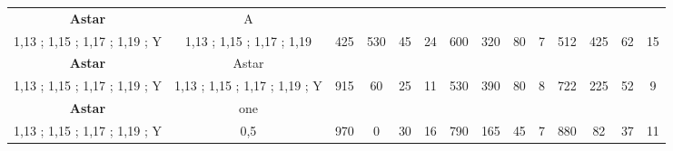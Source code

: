 \begin{table}[H]
{\begin{tabular}{|c|c|c|c|c|c|c|c|c|c|c|c|c|c|}
\cellcolor{blue!15}\textbf{Astar} & A& {\color[HTML]{00009B} } & {\color[HTML]{9A0000} } & {\color[HTML]{009901} } &  & {\color[HTML]{00009B} } & {\color[HTML]{9A0000} } & {\color[HTML]{009901} } &  & {\color[HTML]{00009B} } & {\color[HTML]{9A0000} } & {\color[HTML]{009901} } &  \\ 
\cellcolor{ blue!15}1,13 ; 1,15 ; 1,17 ; 1,19 ; Y & 1,13 ; 1,15 ; 1,17 ; 1,19 & \multirow{-2}{*}{{\color[HTML]{00009B} 425}} & \multirow{-2}{*}{{\color[HTML]{9A0000} 530}} & \multirow{-2}{*}{{\color[HTML]{009901} 45}} & \multirow{-2}{*}{24} & \multirow{-2}{*}{{\color[HTML]{00009B} 600}} & \multirow{-2}{*}{{\color[HTML]{9A0000} 320}} & \multirow{-2}{*}{{\color[HTML]{009901} 80}} & \multirow{-2}{*}{7} & \multirow{-2}{*}{{\color[HTML]{00009B} 512}} & \multirow{-2}{*}{{\color[HTML]{9A0000} 425}} & \multirow{-2}{*}{{\color[HTML]{009901} 62}} & \multirow{-2}{*}{15} \\ \hline

\cellcolor{blue!15}\textbf{Astar} & Astar& {\color[HTML]{00009B} } & {\color[HTML]{9A0000} } & {\color[HTML]{009901} } &  & {\color[HTML]{00009B} } & {\color[HTML]{9A0000} } & {\color[HTML]{009901} } &  & {\color[HTML]{00009B} } & {\color[HTML]{9A0000} } & {\color[HTML]{009901} } &  \\ 
\cellcolor{ blue!15}1,13 ; 1,15 ; 1,17 ; 1,19 ; Y & 1,13 ; 1,15 ; 1,17 ; 1,19 ; Y & \multirow{-2}{*}{{\color[HTML]{00009B} 915}} & \multirow{-2}{*}{{\color[HTML]{9A0000} 60}} & \multirow{-2}{*}{{\color[HTML]{009901} 25}} & \multirow{-2}{*}{11} & \multirow{-2}{*}{{\color[HTML]{00009B} 530}} & \multirow{-2}{*}{{\color[HTML]{9A0000} 390}} & \multirow{-2}{*}{{\color[HTML]{009901} 80}} & \multirow{-2}{*}{8} & \multirow{-2}{*}{{\color[HTML]{00009B} 722}} & \multirow{-2}{*}{{\color[HTML]{9A0000} 225}} & \multirow{-2}{*}{{\color[HTML]{009901} 52}} & \multirow{-2}{*}{9} \\ \hline

\cellcolor{blue!15}\textbf{Astar} & one& {\color[HTML]{00009B} } & {\color[HTML]{9A0000} } & {\color[HTML]{009901} } &  & {\color[HTML]{00009B} } & {\color[HTML]{9A0000} } & {\color[HTML]{009901} } &  & {\color[HTML]{00009B} } & {\color[HTML]{9A0000} } & {\color[HTML]{009901} } &  \\ 
\cellcolor{ blue!15}1,13 ; 1,15 ; 1,17 ; 1,19 ; Y & 0,5 & \multirow{-2}{*}{{\color[HTML]{00009B} 970}} & \multirow{-2}{*}{{\color[HTML]{9A0000} 0}} & \multirow{-2}{*}{{\color[HTML]{009901} 30}} & \multirow{-2}{*}{16} & \multirow{-2}{*}{{\color[HTML]{00009B} 790}} & \multirow{-2}{*}{{\color[HTML]{9A0000} 165}} & \multirow{-2}{*}{{\color[HTML]{009901} 45}} & \multirow{-2}{*}{7} & \multirow{-2}{*}{{\color[HTML]{00009B} 880}} & \multirow{-2}{*}{{\color[HTML]{9A0000} 82}} & \multirow{-2}{*}{{\color[HTML]{009901} 37}} & \multirow{-2}{*}{11} \\ \hline


\end{tabular}}
\end{table}
